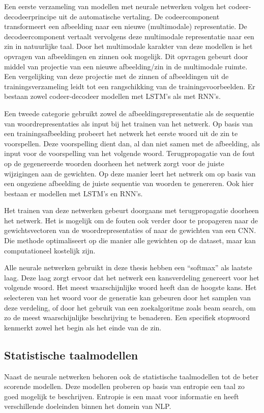 Een eerste verzameling van modellen met neurale netwerken volgen het codeer-decodeerprincipe uit de automatische vertaling\cite{Kiros2014}. De codeercomponent transformeert een afbeelding naar een nieuwe (multimodale) representatie. De decodeercomponent vertaalt vervolgens deze multimodale representatie naar een zin in natuurlijke taal. Door het multimodale karakter van deze modellen is het opvragen van afbeeldingen en zinnen ook mogelijk. Dit opvragen gebeurt door middel van projectie van een nieuwe afbeelding/zin in de multimodale ruimte. Een vergelijking van deze projectie met de zinnen of afbeeldingen uit de trainingsverzameling leidt tot een rangschikking van de trainingsvoorbeelden. Er bestaan zowel codeer-decodeer modellen met LSTM's\cite{Kiros2014} als met RNN's\cite{Karpathy2014,Mao2014a}.

Een tweede categorie gebruikt zowel de afbeeldingsrepresentatie als de sequentie van 
woordrepresentaties als input bij het trainen van het netwerk. Op basis van een trainingsafbeelding probeert het netwerk het eerste woord uit de zin te voorspellen. Deze voorspelling dient dan, al dan niet samen met de afbeelding, als input voor de voorspelling van het volgende woord. Terugpropagatie van de fout op de gegenereerde woorden doorheen het netwerk zorgt voor de juiste wijzigingen aan de gewichten. Op deze manier leert het netwerk om op basis van een ongeziene afbeelding de juiste sequentie van woorden te genereren. Ook hier bestaan er modellen met LSTM's\cite{Donahue2015,Google} en RNN's\cite{Karpathy2015}. 

Het trainen van deze netwerken gebeurt doorgaans met terugpropagatie doorheen het netwerk. Het is mogelijk om de fouten ook verder door te propageren naar de gewichtsvectoren van de woordrepresentaties of naar de gewichten van een CNN. Die methode optimaliseert op die manier alle gewichten op de dataset, maar kan computationeel kostelijk zijn.

Alle neurale netwerken gebruikt in deze thesis hebben een ``softmax'' als laatste laag. Deze laag zorgt ervoor dat het netwerk een kansverdeling genereert voor het volgende woord. Het meest waarschijnlijke woord heeft dan de hoogste kans.
Het selecteren van het woord voor de generatie kan gebeuren door het samplen van deze verdeling, of door het gebruik van een zoekalgoritme zoals beam search, om zo de meest waarschijnlijke beschrijving te benaderen. Een specifiek stopwoord kenmerkt zowel het begin als het einde van de zin.

\subsection{Statistische taalmodellen}
Naast de neurale netwerken behoren ook de statistische taalmodellen tot de beter scorende modellen. Deze modellen proberen op basis van entropie een taal zo goed mogelijk te beschrijven. Entropie is een maat voor informatie en heeft verschillende doeleinden binnen het domein van NLP. 

